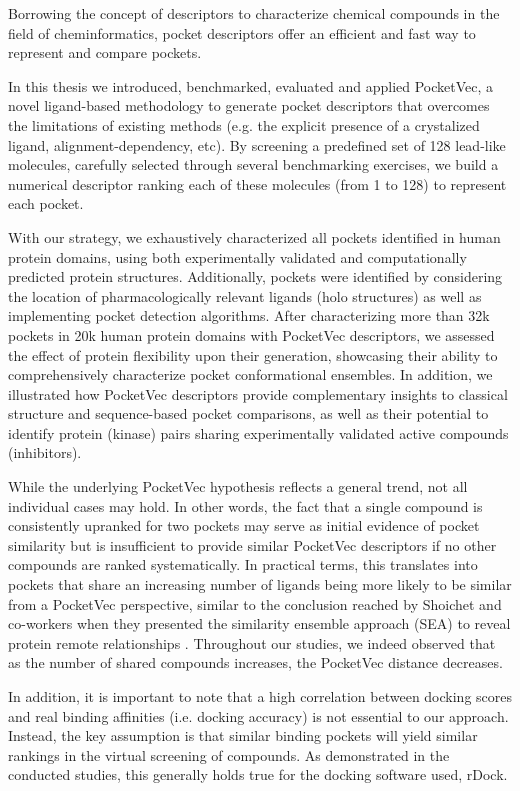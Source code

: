 Borrowing the concept of descriptors to characterize chemical compounds in the field of cheminformatics, pocket descriptors offer an efficient and fast way to represent and compare pockets. 

In this thesis we introduced, benchmarked, evaluated and applied PocketVec, a novel ligand-based methodology to generate pocket descriptors that overcomes the limitations of existing methods (e.g. the explicit presence of a crystalized ligand, alignment-dependency, etc). By screening a predefined set of 128 lead-like molecules, carefully selected through several benchmarking exercises, we build a numerical descriptor ranking each of these molecules (from 1 to 128) to represent each pocket.

With our strategy, we exhaustively characterized all pockets identified in human protein domains, using both experimentally validated and computationally predicted protein structures. Additionally, pockets were identified by considering the location of pharmacologically relevant ligands (holo structures) as well as implementing pocket detection algorithms. After characterizing more than 32k pockets in 20k human protein domains with PocketVec descriptors, we assessed the effect of protein flexibility upon their generation, showcasing their ability to comprehensively characterize pocket conformational ensembles. In addition, we illustrated how PocketVec descriptors provide complementary insights to classical structure and sequence-based pocket comparisons, as well as their potential to identify protein (kinase) pairs sharing experimentally validated active compounds (inhibitors).

While the underlying PocketVec hypothesis reflects a general trend, not all individual cases may hold. In other words, the fact that a single compound is consistently upranked for two pockets may serve as initial evidence of pocket similarity but is insufficient to provide similar PocketVec descriptors if no other compounds are ranked systematically. In practical terms, this translates into pockets that share an increasing number of ligands being more likely to be similar from a PocketVec perspective, similar to the conclusion reached by Shoichet and co-workers when they presented the similarity ensemble approach (SEA) to reveal protein remote relationships \cite{keiser_relating_2007}. Throughout our studies, we indeed observed that as the number of shared compounds increases, the PocketVec distance decreases. 

In addition, it is important to note that a high correlation between docking scores and real binding affinities (i.e. docking accuracy) is not essential to our approach. Instead, the key assumption is that similar binding pockets will yield similar rankings in the virtual screening of compounds. As demonstrated in the conducted studies, this generally holds true for the docking software used, rDock.

